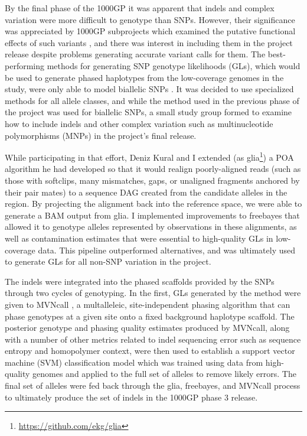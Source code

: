 By the final phase of the 1000GP \cite{1000g2015} it was apparent that indels and complex variation were more difficult to genotype than SNPs.
However, their significance was appreciated by 1000GP subprojects which examined the putative functional effects of such variants \cite{challis2015distribution}, and there was interest in including them in the project release despite problems generating accurate variant calls for them.
The best-performing methods for generating SNP genotype likelihoods (GLs), which would be used to generate phased haplotypes from the low-coverage genomes in the study, were only able to model biallelic SNPs \cite{snptools}.
It was decided to use specialized methods for all allele classes, and while the method used in the previous phase of the project was used for biallelic SNPs, a small study group formed to examine how to include indels and other complex variation such as multinucleotide polymorphisms (MNPs) in the project's final release.

While participating in that effort, Deniz Kural and I extended (as glia\footnote{\url{https://github.com/ekg/glia}}) a POA algorithm he had developed so that it would realign poorly-aligned reads (such as those with softclips, many mismatches, gaps, or unaligned fragments anchored by their pair mates) to a sequence DAG created from the candidate alleles in the region.
By projecting the alignment back into the reference space, we were able to generate a BAM output from glia.
I implemented improvements to freebayes that allowed it to genotype alleles represented by observations in these alignments, as well as contamination estimates that were essential to high-quality GLs in low-coverage data.
This pipeline outperformed alternatives, and was ultimately used to generate GLs for all non-SNP variation in the project.

The indels were integrated into the phased scaffolds provided by the SNPs through two cycles of genotyping.
In the first, GLs generated by the method were given to MVNcall \cite{menelaou2012genotype}, a multalleleic, site-independent phasing algorithm that can phase genotypes at a given site onto a fixed background haplotype scaffold.
The posterior genotype and phasing quality estimates produced by MVNcall, along with a number of other metrics related to indel sequencing error such as sequence entropy and homopolymer context, were then used to establish a support vector machine (SVM) classification model which was trained using data from high-quality genomes and applied to the full set of alleles to remove likely errors.
The final set of alleles were fed back through the glia, freebayes, and MVNcall process to ultimately produce the set of indels in the 1000GP phase 3 release.

